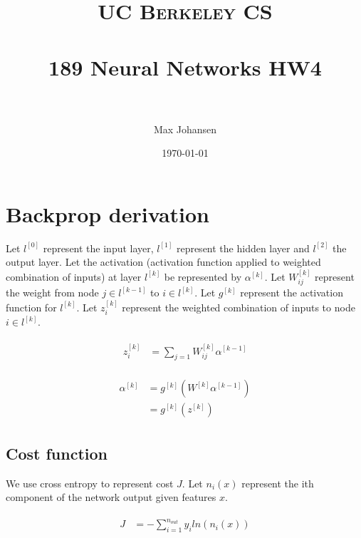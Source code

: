 \documentclass[paper=a4, fontsize=11pt]{scrartcl} %
\title{	
\normalfont \normalsize 
\textsc{UC Berkeley CS} \\ [25pt] %
\horrule{0.5pt} \\[0.4cm] %
\huge 189 Neural Networks HW4 \\ %
\horrule{2pt} \\[0.5cm] %
}
\author{Max Johansen} %
\date{\normalsize\today} %
\numberwithin{equation}{section} %
\numberwithin{figure}{section} %
\numberwithin{table}{section} %
\begin{document}
\maketitle %


\section{Backprop derivation}

Let $l^{[0]}$ represent the input layer, $l^{[1]}$ represent the hidden layer and $l^{[2]}$ the output layer. Let the activation (activation function applied to weighted combination of inputs) at layer $l^{[k]}$ be represented by $\alpha^{[k]}$. Let $W^{[k]}_{ij}$ represent the weight from node $j \in l^{[k-1]}$ to  $i \in l^{[k]}$. Let $g^{[k]}$ represent the activation function for $l^{[k]}$. Let $z^{[k]}_i$ represent the weighted combination of inputs to node $i \in l^{[k]}$.

\begin{align} 
\begin{split}
z^{[k]}_i 	&= \sum_{j=1}^{}W_{ij}^{[k]}\alpha^{[k-1]}
\end{split}					
\end{align}


\begin{align} 
\begin{split}
\alpha^{[k]} 	&= g^{[k]}(W^{[k]}\alpha^{[k-1]})\\
&=  g^{[k]}(z^{[k]})
\end{split}					
\end{align}


\subsection{Cost function}
We use cross entropy to represent cost $J$. Let $n_i(x)$ represent the ith component of the network output given features $x$.

\begin{align} 
\begin{split}
J 	&= -\sum_{i=1}^{n_{out}}y_i ln (n_i(x))
\end{split}					
\end{align}
\end{document}
